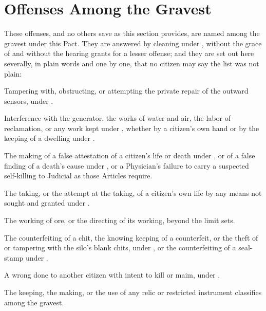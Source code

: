 \section{Offenses Among the Gravest}
\label{sec:crimes:offenses-among-the-gravest}

These offenses, and no others save as this section provides, are named among the gravest under this Pact. They are answered by cleaning under , without the grace of  and without the hearing  grants for a lesser offense; and they are set out here severally, in plain words and one by one, that no citizen may say the list was not plain:

\begin{clauses}
\item Tampering with, obstructing, or attempting the private repair of the outward sensors, under .
\item Interference with the generator, the works of water and air, the labor of reclamation, or any work kept under , whether by a citizen's own hand or by the keeping of a dwelling under .
\item The making of a false attestation of a citizen's life or death under , or of a false finding of a death's cause under , or a Physician's failure to carry a suspected self-killing to Judicial as those Articles require.
\item The taking, or the attempt at the taking, of a citizen's own life by any means not sought and granted under .
\item The working of ore, or the directing of its working, beyond the limit  sets.
\item The counterfeiting of a chit, the knowing keeping of a counterfeit, or the theft of or tampering with the silo's blank chits, under , or the counterfeiting of a seal-stamp under .
\item A wrong done to another citizen with intent to kill or maim, under .
\item The keeping, the making, or the use of any relic or restricted instrument  classifies among the gravest.
\end{clauses}

